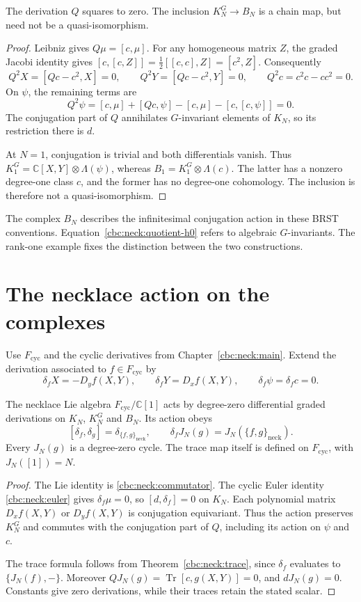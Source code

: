 \begin{proposition}\label{cbc:neck:brst-square}
The derivation $Q$ squares to zero.  The inclusion $K_N^G\to B_N$ is a chain
map, but need not be a quasi-isomorphism.
\end{proposition}
\begin{proof}
Leibniz gives $Q\mu=[c,\mu]$.  For any homogeneous matrix $Z$, the graded
Jacobi identity gives $[c,[c,Z]]=\tfrac12[[c,c],Z]=[c^2,Z]$.
Consequently
\[
 Q^2X=[Qc-c^2,X]=0,\qquad Q^2Y=[Qc-c^2,Y]=0,
 \qquad Q^2c=c^2c-cc^2=0.
\]
On $\psi$, the remaining terms are
\[
 Q^2\psi=[c,\mu]+[Qc,\psi]-[c,\mu]-[c,[c,\psi]]=0.
\]
The conjugation part of $Q$ annihilates $G$-invariant elements of $K_N$, so
its restriction there is $d$.

At $N=1$, conjugation is trivial and both differentials vanish.  Thus
$K_1^G=\mathbb C[X,Y]\otimes\Lambda(\psi)$, whereas
$B_1=K_1^G\otimes\Lambda(c)$.  The latter has a nonzero degree-one class $c$,
and the former has no degree-one cohomology.  The inclusion is therefore
not a quasi-isomorphism.
\end{proof}

The complex $B_N$ describes the infinitesimal conjugation action in these
BRST conventions.  Equation~\eqref{cbc:neck:quotient-h0} refers to algebraic
$G$-invariants.  The rank-one example fixes the distinction between the two
constructions.

\section{The necklace action on the complexes}
Use $F_{\mathrm{cyc}}$ and the cyclic derivatives from
Chapter~\ref{cbc:neck:main}.  Extend the derivation associated to
$f\in F_{\mathrm{cyc}}$ by
\[
 \delta_fX=-D_yf(X,Y),\qquad \delta_fY=D_xf(X,Y),
 \qquad \delta_f\psi=\delta_fc=0.
\]

\begin{theorem}\label{thm:necklace}
The necklace Lie algebra $F_{\mathrm{cyc}}/\mathbb C[1]$ acts by degree-zero
differential graded derivations on $K_N$, $K_N^G$ and $B_N$.  Its action obeys
\[
 [\delta_f,\delta_g]=\delta_{\{f,g\}_{\mathrm{neck}}},
 \qquad \delta_fJ_N(g)=J_N(\{f,g\}_{\mathrm{neck}}).
\]
Every $J_N(g)$ is a degree-zero cycle.  The trace map itself is defined on
$F_{\mathrm{cyc}}$, with $J_N([1])=N$.
\end{theorem}
\begin{proof}
The Lie identity is \eqref{cbc:neck:commutator}.  The cyclic Euler identity
\eqref{cbc:neck:euler} gives $\delta_f\mu=0$, so $[d,\delta_f]=0$ on $K_N$.
Each polynomial matrix $D_xf(X,Y)$ or $D_yf(X,Y)$ is conjugation equivariant.
Thus the action preserves $K_N^G$ and commutes with the conjugation part of
$Q$, including its action on $\psi$ and $c$.

The trace formula follows from Theorem~\ref{cbc:neck:trace}, since
$\delta_f$ evaluates to $\{J_N(f),-\}$.  Moreover
$QJ_N(g)=\operatorname{Tr}[c,g(X,Y)]=0$, and $dJ_N(g)=0$.
Constants give zero derivations, while their traces retain the stated scalar.
\end{proof}


